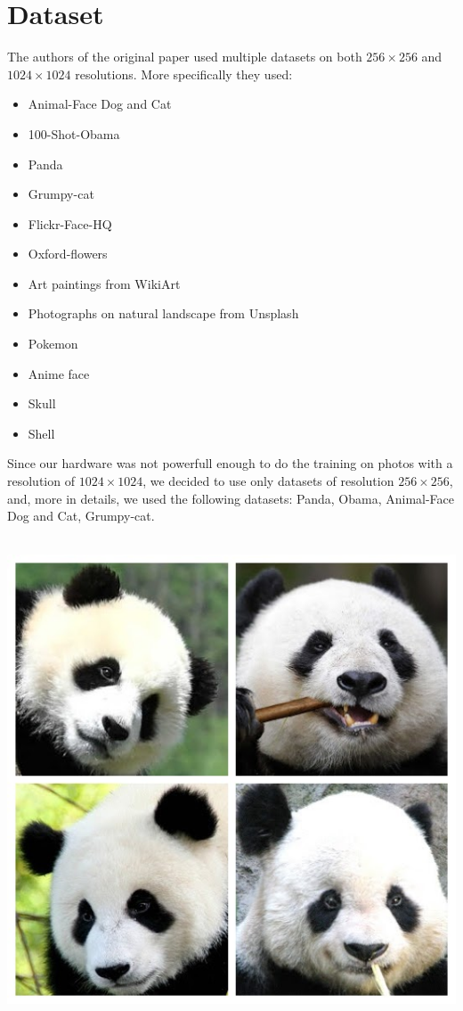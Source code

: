 \documentclass[12pt]{article}
\begin{document}
\section{Dataset}
\large
The authors of the original paper used multiple datasets on both $256 \times 256$ and $1024 \times 1024$ resolutions. More specifically
they used:
\begin{itemize}
	\setlength\itemsep{0.01em}
	\item {	
		Animal-Face Dog and Cat
	}
	\item {
		100-Shot-Obama
	}
	\item {
		Panda
	}
	\item {
		Grumpy-cat
	}
	\item {
		Flickr-Face-HQ
	}
	\item {
		Oxford-flowers
	}
	\item {
		Art paintings from WikiArt
	}
	\item {
		Photographs on natural landscape from Unsplash
	}
	\item {
		Pokemon
	}
	\item {
		Anime face
	}
	\item {
		Skull
	}
	\item {
		Shell
	}
\end{itemize} 
Since our hardware was not powerfull enough to do the training on photos with a resolution of $1024 \times 1024$, we decided to use only
datasets of resolution $256 \times 256$, and, more in details, we used the following datasets: Panda, Obama, Animal-Face Dog and Cat,
Grumpy-cat.\\\\
\begin{minipage}[t]{0.2\textwidth}
	\includegraphics[width=1\textwidth]{Images/panda.jpg}
\end{minipage}
\end{document}
